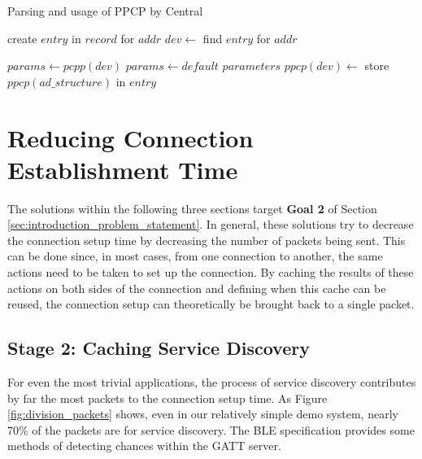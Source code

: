 \begin{algorithm}
    \caption{Parsing and usage of PPCP by Central}
    \label{alg:on_device_found}
    \begin{algorithmic}[1] 
                \State create $entry$ in $record$ for $addr$
            \EndIf
            \State $dev \gets $ find $entry$ for $addr$
            \State {}

                    \State $params \gets \textit{pcpp}(dev)$
                \Else
                    \State $params \gets default$ $parameters$
                \EndIf
                \State {}
            \EndIf
        \EndProcedure
                        \State $\textit{ppcp}(dev) \gets $ store $\textit{ppcp}(ad\_structure)$ in $entry$
                    \EndIf
                \EndIf
            \EndFor
        \EndProcedure
    \end{algorithmic}
\end{algorithm}

\section{Reducing Connection Establishment Time}
The solutions within the following three sections target \textbf{Goal 2} of Section \ref{sec:introduction_problem_statement}. In general, these solutions try to decrease the connection setup time by decreasing the number of packets being sent. This can be done since, in most cases, from one connection to another, the same actions need to be taken to set up the connection. By caching the results of these actions on both sides of the connection and defining when this cache can be reused, the connection setup can theoretically be brought back to a single packet.

\subsection{Stage 2: Caching Service Discovery}
For even the most trivial applications, the process of service discovery contributes by far the most packets to the connection setup time. As Figure \ref{fig:division_packets} shows, even in our relatively simple demo system, nearly 70\% of the packets are for service discovery. The BLE specification provides some methods of detecting chances within the GATT server.

